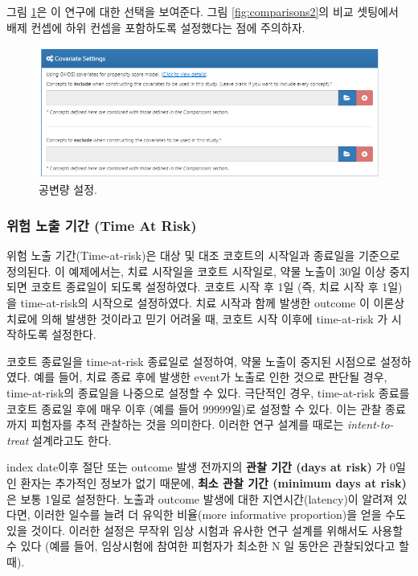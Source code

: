 \documentclass[11pt]{book}
\theoremstyle{definition}
\theoremstyle{definition}
\theoremstyle{definition}
\theoremstyle{remark}
\begin{document}
그림 \ref{fig:covariateSettings}은 이 연구에 대한 선택을 보여준다. 그림
\ref{fig:comparisons2}의 비교 셋팅에서 배제 컨셉에 하위 컨셉을
포함하도록 설정했다는 점에 주의하자.

\begin{figure}

{\centering \includegraphics[width=1\linewidth]{images/PopulationLevelEstimation/covariateSettings} 

}

\caption{공변량 설정.}\label{fig:covariateSettings}
\end{figure}

\subsubsection*{위험 노출 기간 (Time At Risk)}\label{---time-at-risk}

위험 노출 기간(Time-at-risk)은 대상 및 대조 코호트의 시작일과 종료일을
기준으로 정의된다. 이 예제에서는, 치료 시작일을 코호트 시작일로, 약물
노출이 30일 이상 중지되면 코호트 종료일이 되도록 설정하였다. 코호트 시작
후 1일 (즉, 치료 시작 후 1일) 을 time-at-risk의 시작으로 설정하였다.
치료 시작과 함께 발생한 outcome 이 이론상 치료에 의해 발생한 것이라고
믿기 어려울 때, 코호트 시작 이후에 time-at-risk 가 시작하도록 설정한다.

코호트 종료일을 time-at-risk 종료일로 설정하여, 약물 노출이 중지된
시점으로 설정하였다. 예를 들어, 치료 종료 후에 발생한 event가 노출로
인한 것으로 판단될 경우, time-at-risk의 종료일을 나중으로 설정할 수
있다. 극단적인 경우, time-at-risk 종료를 코호트 종료일 후에 매우 이후
(예를 들어 99999일)로 설정할 수 있다. 이는 관찰 종료까지 피험자를 추적
관찰하는 것을 의미한다. 이러한 연구 설계를 때로는 \emph{intent-to-treat}
설계라고도 한다.

index date이후 절단 또는 outcome 발생 전까지의 \textbf{관찰 기간 (days
at risk)} 가 0일인 환자는 추가적인 정보가 없기 때문에, \textbf{최소 관찰
기간 (minimum days at risk)} 은 보통 1일로 설정한다. 노출과 outcome
발생에 대한 지연시간(latency)이 알려져 있다면, 이러한 일수를 늘려 더
유익한 비율(more informative proportion)을 얻을 수도 있을 것이다. 이러한
설정은 무작위 임상 시험과 유사한 연구 설계를 위해서도 사용할 수 있다
(예를 들어, 임상시험에 참여한 피험자가 최소한 N 일 동안은 관찰되었다고
할 때).
\end{document}
